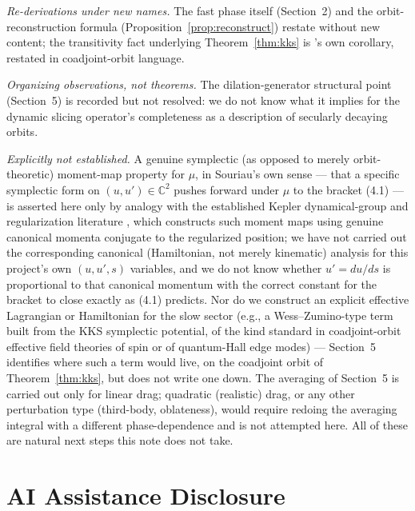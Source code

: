 \documentclass[11pt]{amsart}
\theoremstyle{remark}
\begin{document}
\emph{Re-derivations under new names.} The fast phase itself (Section~2) and the orbit-reconstruction formula (Proposition~\ref{prop:reconstruct}) restate \cite{Ebert2026LeviCivita} without new content; the transitivity fact underlying Theorem~\ref{thm:kks} is \cite{Ebert2026Cone}'s own corollary, restated in coadjoint-orbit language.

\emph{Organizing observations, not theorems.} The dilation-generator structural point (Section~5) is recorded but not resolved: we do not know what it implies for the dynamic slicing operator's completeness as a description of secularly decaying orbits.

\emph{Explicitly not established.} A genuine symplectic (as opposed to merely orbit-theoretic) moment-map property for $\mu$, in Souriau's own sense --- that a specific symplectic form on $(u,u')\in\mathbb C^2$ pushes forward under $\mu$ to the bracket (4.1) --- is asserted here only by analogy with the established Kepler dynamical-group and regularization literature \cite{BacryRueggSouriau1966,Moser1970,KustaanheimoStiefel1965}, which constructs such moment maps using genuine canonical momenta conjugate to the regularized position; we have not carried out the corresponding canonical (Hamiltonian, not merely kinematic) analysis for this project's own $(u,u',s)$ variables, and we do not know whether $u'=du/ds$ is proportional to that canonical momentum with the correct constant for the bracket to close exactly as (4.1) predicts. Nor do we construct an explicit effective Lagrangian or Hamiltonian for the slow sector (e.g., a Wess--Zumino-type term built from the KKS symplectic potential, of the kind standard in coadjoint-orbit effective field theories of spin or of quantum-Hall edge modes) --- Section~5 identifies where such a term would live, on the coadjoint orbit of Theorem~\ref{thm:kks}, but does not write one down. The averaging of Section~5 is carried out only for linear drag; quadratic (realistic) drag, or any other perturbation type (third-body, oblateness), would require redoing the averaging integral with a different phase-dependence and is not attempted here. All of these are natural next steps this note does not take.

\section*{AI Assistance Disclosure}
\end{document}
